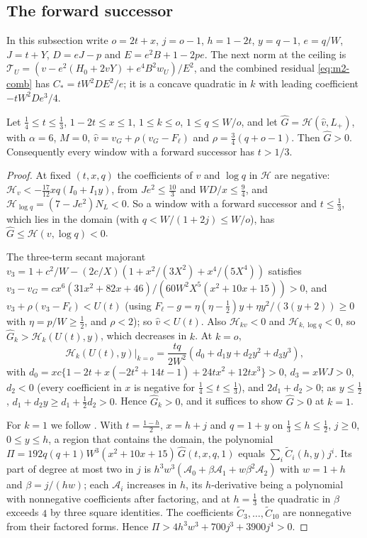 \subsection{The forward successor}\label{app:m2-forward-signs}

In this subsection write $o=2t+x$, $j=o-1$, $h=1-2t$, $y=q-1$, $e=q/W$, $J=t+Y$, $D=eJ-p$ and
$E=e^2B+1-2pe$. The next norm at the ceiling is $\mathcal T_U=(v-e^2(H_0+2vY)+e^4B^2w_U)/E^2$, and
the combined residual \eqref{eq:m2-comb} has $C_*=tW^2DE^2/e$; it is a concave quadratic in $k$
with leading coefficient $-tW^2De^3/4$.

\begin{lemma}\label{lem:m2-low-ratio}
Let $\frac14\le t\le\frac13$, $1-2t\le x\le1$, $1\le k\le o$, $1\le q\le W/o$, and let
$\widehat G=\mathcal H(\hat v,L_+)$, with $\alpha=6$, $M=0$, $\hat v=v_G+\rho(v_G-F_\ell)$ and
$\rho=\frac34(q+o-1)$. Then $\widehat G>0$. Consequently every window with a forward successor has
$t>1/3$.
\end{lemma}

\begin{proof}
At fixed $(t,x,q)$ the coefficients of $v$ and $\log q$ in $\mathcal H$ are negative:
$\mathcal H_v<-\frac{17}{12}xq(I_0+I_1y)$, from $Je^2\le\frac{10}3$ and $WD/x\le\frac94$, and
$\mathcal H_{\log q}=(7-Je^2)N_L<0$. So a window with a forward successor and $t\le\frac13$, which
lies in the domain (with $q<W/(1+2j)\le W/o$), has $\widehat G\le\mathcal H(v,\log q)<0$.

The three-term secant majorant $v_3=1+c^2/W-(2c/X)(1+x^2/(3X^2)+x^4/(5X^4))$ satisfies
$v_3-v_G=cx^6(31x^2+82x+46)/(60W^2X^5(x^2+10x+15))>0$, and $v_3+\rho(v_3-F_\ell)<U(t)$ (using
$F_\ell-g=\eta(\eta-\frac12)y+\eta y^2/(3(y+2))\ge0$ with $\eta=p/W\ge\frac12$, and $\rho<2$); so
$\hat v<U(t)$. Also $\mathcal H_{kv}<0$ and $\mathcal H_{k,\log q}<0$, so
$\widehat G_k>\mathcal H_k(U(t),y)$, which decreases in $k$. At $k=o$,
\[
\mathcal H_k(U(t),y)\big|_{k=o}=\frac{tq}{2W^2}(d_0+d_1y+d_2y^2+d_3y^3),
\]
with $d_0=xc\{1-2t+x(-2t^2+14t-1)+24tx^2+12tx^3\}>0$, $d_3=xWJ>0$, $d_2<0$ (every coefficient
in $x$ is negative for $\frac14\le t\le\frac13$), and $2d_1+d_2>0$; as $y\le\frac12$,
$d_1+d_2y\ge d_1+\frac12d_2>0$. Hence $\widehat G_k>0$, and it suffices to show $\widehat G>0$ at $k=1$.

For $k=1$ we follow \cite[\texttt{NONSHORT\_\allowbreak LOW\_\allowbreak RATIO\_\allowbreak LINK}]{LighterProofs}.
With $t=\frac{1-h}2$, $x=h+j$ and $q=1+y$ on $\frac13\le h\le\frac12$, $j\ge0$, $0\le y\le h$, a region
that contains the domain, the polynomial $\Pi=192q(q+1)W^3(x^2+10x+15)\,\widehat G(t,x,q,1)$ equals
$\sum_i\tilde C_i(h,y)j^i$. Its part of degree at most two in $j$ is
$h^3w^3(\mathcal A_0+\beta\mathcal A_1+w\beta^2\mathcal A_2)$ with $w=1+h$ and $\beta=j/(hw)$; each
$\mathcal A_i$ increases in $h$, its $h$-derivative being a polynomial with nonnegative
coefficients after factoring, and at $h=\frac13$ the quadratic in $\beta$ exceeds $4$ by three square
identities. The coefficients $\tilde C_3,\dots,\tilde C_{10}$ are nonnegative from their factored
forms. Hence $\Pi>4h^3w^3+700j^3+3900j^4>0$.
\end{proof}

